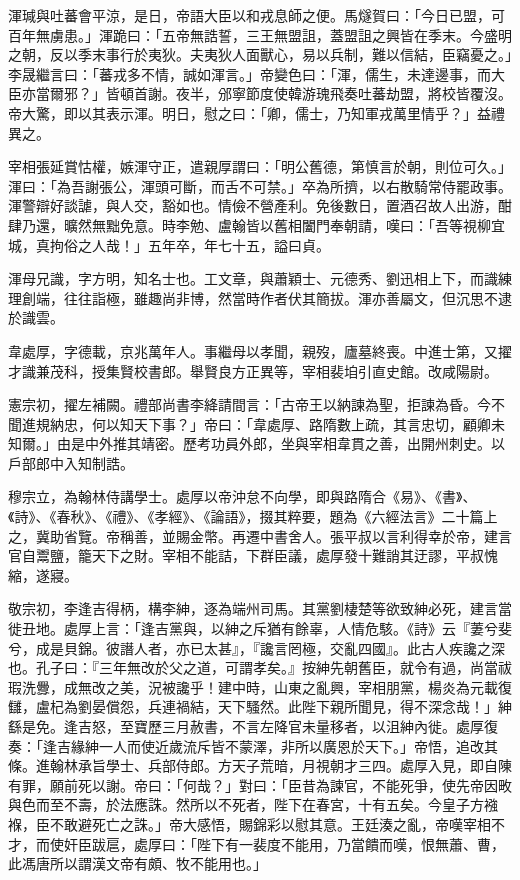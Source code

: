 \begin{pinyinscope}
 渾瑊與吐蕃會平涼，是日，帝語大臣以和戎息師之便。馬燧賀曰：「今日已盟，可百年無虜患。」渾跪曰：「五帝無誥誓，三王無盟詛，蓋盟詛之興皆在季末。今盛明之朝，反以季末事行於夷狄。夫夷狄人面獸心，易以兵制，難以信結，臣竊憂之。」李晟繼言曰：「蕃戎多不情，誠如渾言。」帝變色曰：「渾，儒生，未達邊事，而大臣亦當爾邪？」皆頓首謝。夜半，邠寧節度使韓游瑰飛奏吐蕃劫盟，將校皆覆沒。帝大驚，即以其表示渾。明日，慰之曰：「卿，儒士，乃知軍戎萬里情乎？」益禮異之。



 宰相張延賞怙權，嫉渾守正，遣親厚謂曰：「明公舊德，第慎言於朝，則位可久。」渾曰：「為吾謝張公，渾頭可斷，而舌不可禁。」卒為所擠，以右散騎常侍罷政事。渾警辯好談謔，與人交，豁如也。情儉不營產利。免後數日，置酒召故人出游，酣肆乃還，曠然無黜免意。時李勉、盧翰皆以舊相闔門奉朝請，嘆曰：「吾等視柳宜城，真拘俗之人哉！」五年卒，年七十五，謚曰貞。



 渾母兄識，字方明，知名士也。工文章，與蕭穎士、元德秀、劉迅相上下，而識練理創端，往往詣極，雖趣尚非博，然當時作者伏其簡拔。渾亦善屬文，但沉思不逮於識雲。



 韋處厚，字德載，京兆萬年人。事繼母以孝聞，親歿，廬墓終喪。中進士第，又擢才識兼茂科，授集賢校書郎。舉賢良方正異等，宰相裴垍引直史館。改咸陽尉。



 憲宗初，擢左補闕。禮部尚書李絳請間言：「古帝王以納諫為聖，拒諫為昏。今不聞進規納忠，何以知天下事？」帝曰：「韋處厚、路隋數上疏，其言忠切，顧卿未知爾。」由是中外推其靖密。歷考功員外郎，坐與宰相韋貫之善，出開州刺史。以戶部郎中入知制誥。



 穆宗立，為翰林侍講學士。處厚以帝沖怠不向學，即與路隋合《易》、《書》、《詩》、《春秋》、《禮》、《孝經》、《論語》，掇其粹要，題為《六經法言》二十篇上之，冀助省覽。帝稱善，並賜金幣。再遷中書舍人。張平叔以言利得幸於帝，建言官自鬻鹽，籠天下之財。宰相不能詰，下群臣議，處厚發十難誚其迂謬，平叔愧縮，遂寢。



 敬宗初，李逢吉得柄，構李紳，逐為端州司馬。其黨劉棲楚等欲致紳必死，建言當徙丑地。處厚上言：「逢吉黨與，以紳之斥猶有餘辜，人情危駭。《詩》云『萋兮斐兮，成是貝錦。彼譖人者，亦已太甚』，『讒言罔極，交亂四國』。此古人疾讒之深也。孔子曰：『三年無改於父之道，可謂孝矣。』按紳先朝舊臣，就令有過，尚當祓瑕洗釁，成無改之美，況被讒乎！建中時，山東之亂興，宰相朋黨，楊炎為元載復讎，盧杞為劉晏償怨，兵連禍結，天下騷然。此陛下親所聞見，得不深念哉！」紳繇是免。逢吉怒，至寶歷三月赦書，不言左降官未量移者，以沮紳內徙。處厚復奏：「逢吉緣紳一人而使近歲流斥皆不蒙澤，非所以廣恩於天下。」帝悟，追改其條。進翰林承旨學士、兵部侍郎。方天子荒暗，月視朝才三四。處厚入見，即自陳有罪，願前死以謝。帝曰：「何哉？」對曰：「臣昔為諫官，不能死爭，使先帝因畋與色而至不壽，於法應誅。然所以不死者，陛下在春宮，十有五矣。今皇子方襁褓，臣不敢避死亡之誅。」帝大感悟，賜錦彩以慰其意。王廷湊之亂，帝嘆宰相不才，而使奸臣跋扈，處厚曰：「陛下有一裴度不能用，乃當饋而嘆，恨無蕭、曹，此馮唐所以謂漢文帝有頗、牧不能用也。」




\end{pinyinscope}
